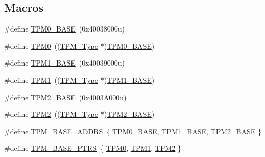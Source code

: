 \subsection*{Macros}
\begin{DoxyCompactItemize}
\item 
\#define \mbox{\hyperlink{group___t_p_m___peripheral___access___layer_gafce6fdf5fb48d6c6b77a8c5a86ae50c2}{T\+P\+M0\+\_\+\+B\+A\+SE}}~(0x40038000u)
\item 
\#define \mbox{\hyperlink{group___t_p_m___peripheral___access___layer_ga255cfcfa3e71e5e8bc0f8eb3272de220}{T\+P\+M0}}~((\mbox{\hyperlink{struct_t_p_m___type}{T\+P\+M\+\_\+\+Type}} $\ast$)\mbox{\hyperlink{group___t_p_m___peripheral___access___layer_gafce6fdf5fb48d6c6b77a8c5a86ae50c2}{T\+P\+M0\+\_\+\+B\+A\+SE}})
\item 
\#define \mbox{\hyperlink{group___t_p_m___peripheral___access___layer_ga563e0e90d795a6083656fd2d61c0f694}{T\+P\+M1\+\_\+\+B\+A\+SE}}~(0x40039000u)
\item 
\#define \mbox{\hyperlink{group___t_p_m___peripheral___access___layer_ga2e4965bffa80b3aab662e2d60096ae53}{T\+P\+M1}}~((\mbox{\hyperlink{struct_t_p_m___type}{T\+P\+M\+\_\+\+Type}} $\ast$)\mbox{\hyperlink{group___t_p_m___peripheral___access___layer_ga563e0e90d795a6083656fd2d61c0f694}{T\+P\+M1\+\_\+\+B\+A\+SE}})
\item 
\#define \mbox{\hyperlink{group___t_p_m___peripheral___access___layer_gac3255fe3941602acc3b942bb6d885611}{T\+P\+M2\+\_\+\+B\+A\+SE}}~(0x4003\+A000u)
\item 
\#define \mbox{\hyperlink{group___t_p_m___peripheral___access___layer_ga833a0146c6466718ff4e2ffa215355ea}{T\+P\+M2}}~((\mbox{\hyperlink{struct_t_p_m___type}{T\+P\+M\+\_\+\+Type}} $\ast$)\mbox{\hyperlink{group___t_p_m___peripheral___access___layer_gac3255fe3941602acc3b942bb6d885611}{T\+P\+M2\+\_\+\+B\+A\+SE}})
\item 
\#define \mbox{\hyperlink{group___t_p_m___peripheral___access___layer_ga0087611419dac57b62b50b4fb052ce37}{T\+P\+M\+\_\+\+B\+A\+S\+E\+\_\+\+A\+D\+D\+RS}}~\{ \mbox{\hyperlink{group___t_p_m___peripheral___access___layer_gafce6fdf5fb48d6c6b77a8c5a86ae50c2}{T\+P\+M0\+\_\+\+B\+A\+SE}}, \mbox{\hyperlink{group___t_p_m___peripheral___access___layer_ga563e0e90d795a6083656fd2d61c0f694}{T\+P\+M1\+\_\+\+B\+A\+SE}}, \mbox{\hyperlink{group___t_p_m___peripheral___access___layer_gac3255fe3941602acc3b942bb6d885611}{T\+P\+M2\+\_\+\+B\+A\+SE}} \}
\item 
\#define \mbox{\hyperlink{group___t_p_m___peripheral___access___layer_ga1d61ed554c056d8f63d1dbcc7ce05e62}{T\+P\+M\+\_\+\+B\+A\+S\+E\+\_\+\+P\+T\+RS}}~\{ \mbox{\hyperlink{group___t_p_m___peripheral___access___layer_ga255cfcfa3e71e5e8bc0f8eb3272de220}{T\+P\+M0}}, \mbox{\hyperlink{group___t_p_m___peripheral___access___layer_ga2e4965bffa80b3aab662e2d60096ae53}{T\+P\+M1}}, \mbox{\hyperlink{group___t_p_m___peripheral___access___layer_ga833a0146c6466718ff4e2ffa215355ea}{T\+P\+M2}} \}

\end{DoxyCompactItemize}
